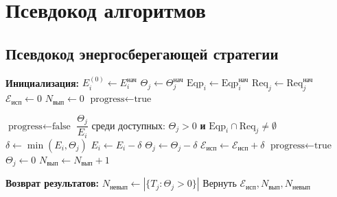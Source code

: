 \chapter{Псевдокод алгоритмов}\label{app:pseudo}

\section{Псевдокод энергосберегающей стратегии}\label{app:pseudo_1}

\begin{breakablealgorithm}
	\label{pscode:e}
	\caption{Псевдокод стратегии $\Gamma_{\min\text{Э}}$}
	\begin{algorithmic}[1]
		\State \textbf{Инициализация:}
		\State \quad $E_i^{(0)} \gets E_i^{\text{нач}}$ 
		\State \quad $\Theta_j \gets \Theta_j^{\text{нач}}$ 
		\State \quad $\text{Eqp}_i \gets \text{Eqp}_i^{\text{нач}}$ 
		\State \quad $\text{Req}_j \gets \text{Req}_j^{\text{нач}}$ 
		\State \quad $\mathcal{E}_{\text{исп}} \gets 0$ 
		\State \quad $N_{\text{вып}} \gets 0$ 
		\State \quad $\text{progress} \gets \text{true}$

		\State \quad $\text{progress} \gets \text{false}$
		\State \quad {} $\dfrac{\Theta_j}{E_i}$
		\State \quad среди доступных: $\Theta_j > 0$ \textbf{и} $\text{Eqp}_i \cap \text{Req}_j \neq \emptyset$
		\State \quad $\delta \gets \min(E_i, \Theta_j)$ 
		\State \quad $E_i \gets E_i - \delta$
		\State \quad $\Theta_j \gets \Theta_j - \delta$
		\State \quad $\mathcal{E}_{\text{исп}} \gets \mathcal{E}_{\text{исп}} + \delta$
		\State \quad $\text{progress} \gets \text{true}$
		\State \quad $\Theta_j \gets 0$
		\State \quad $N_{\text{вып}} \gets N_{\text{вып}} + 1$
		\EndIf
		\EndIf
		\EndIf
		\EndFor
		\EndWhile

		\State \textbf{Возврат результатов:}
		\State \quad $N_{\text{невып}} \gets |\{T_j : \Theta_j > 0\}|$
		\State \quad Вернуть $\mathcal{E}_{\text{исп}}, N_{\text{вып}}, N_{\text{невып}}$
	\end{algorithmic}
\end{breakablealgorithm}

\clearpage

